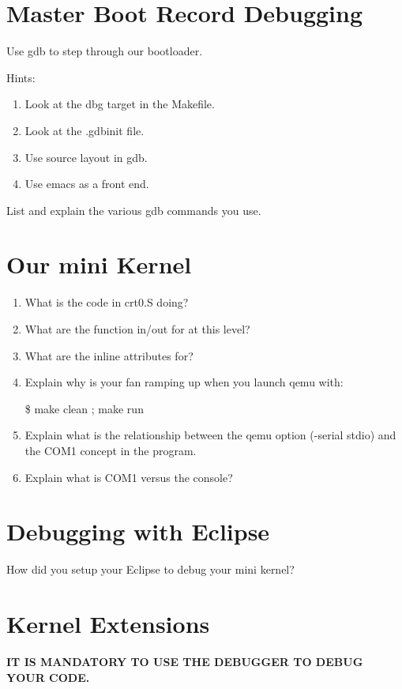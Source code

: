 \documentclass[10]{article}
\begin{document}
\section{Master Boot Record Debugging}

Use gdb to step through our bootloader.

Hints: 
\begin{enumerate}
\item 
Look at the dbg target in the Makefile.
\item
Look at the .gdbinit file.
\item
Use source layout in gdb.
\item
Use emacs as a front end.
\end{enumerate}

List and explain the various gdb commands you use.

\section{Our mini Kernel}

\begin{enumerate}
\item
What is the code in crt0.S doing?
\item
What are the function in/out for at this level?
\item
What are the inline attributes for?
\item
Explain why is your fan ramping up when you launch qemu with:

  \$ make clean ; make run

\item
Explain what is the relationship between the qemu option (-serial stdio)
and the COM1 concept in the program.
\item
Explain what is COM1 versus the console?
\end{enumerate}

\section{Debugging with Eclipse}

How did you setup your Eclipse to debug your mini kernel?

\section{Kernel Extensions}

{\bf IT IS MANDATORY TO USE THE DEBUGGER TO DEBUG YOUR CODE.}
\end{document}
